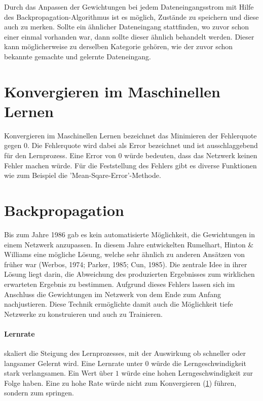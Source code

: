 Durch das Anpassen der Gewichtungen bei jedem Dateneingangsstrom mit Hilfe des Backpropagation-Algorithmus ist es möglich, Zustände zu speichern und diese auch zu merken. 
Sollte ein ähnlicher Dateneingang stattfinden, wo zuvor schon einer einmal vorhanden war, dann sollte dieser ähnlich behandelt werden.
Dieser kann möglicherweise zu derselben Kategorie gehören, wie der zuvor schon bekannte gemachte und gelernte Dateneingang.

\section{Konvergieren im Maschinellen Lernen}
\label{sec:Konvergieren}

Konvergieren im Maschinellen Lernen bezeichnet das Minimieren der Fehlerquote gegen $0$.
Die Fehlerquote wird dabei als Error bezeichnet und ist ausschlaggebend für den Lernprozess.
Eine Error von $0$ würde bedeuten, dass das Netzwerk keinen Fehler machen würde.
Für die Feststellung des Fehlers gibt es diverse Funktionen wie zum Beispiel die 'Mean-Sqare-Error'-Methode.

\section{Backpropagation}
\label{sec:Backpropagation}

Bis zum Jahre 1986 gab es kein automatisierte Möglichkeit, die Gewichtungen in einem Netzwerk anzupassen.
In diesem Jahre entwickelten Rumelhart, Hinton \& Williams eine mögliche Lösung, welche sehr ähnlich zu anderen Ansätzen von früher war (Werbos, 1974; Parker, 1985; Cun, 1985).
Die zentrale Idee in ihrer Lösung liegt darin, die Abweichung des produzierten Ergebnisses zum wirklichen erwarteten Ergebnis zu bestimmen. 
Aufgrund dieses Fehlers lassen sich im Anschluss die Gewichtungen im Netzwerk von dem Ende zum Anfang nachjustieren. 
Diese Technik ermöglichte damit auch die Möglichkeit tiefe Netzwerke zu konstruieren und auch zu Trainieren.

\paragraph{Lernrate} skaliert die Steigung des Lernprozesses, mit der Auswirkung ob schneller oder langsamer Gelernt wird.
Eine Lernrate unter $0$ würde die Lerngeschwindigkeit stark verlangsamen. 
Ein Wert über $1$ würde eine hohen Lerngeschwindigkeit zur Folge haben. 
Eine zu hohe Rate würde nicht zum Konvergieren (\ref{sec:Konvergieren}) führen, sondern zum springen.

